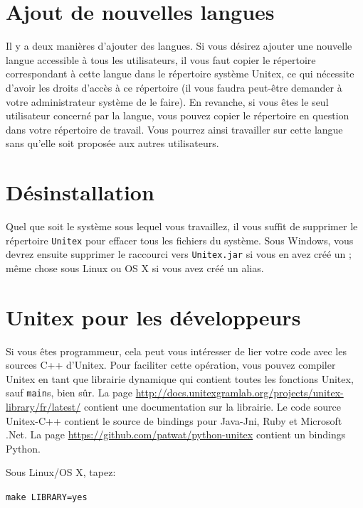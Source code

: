 \section{Ajout de nouvelles langues}

\bigskip
\noindent Il y a deux manières d’ajouter des langues. Si vous désirez ajouter une nouvelle langue
accessible à tous les utilisateurs, il vous faut copier le répertoire correspondant à cette langue
dans le répertoire système Unitex,
ce qui nécessite d’avoir les droits d’accès à ce répertoire
(il vous faudra peut-être demander à votre administrateur système de le faire).
En revanche, si vous êtes le seul utilisateur concerné par la langue, vous pouvez copier le répertoire
en question dans votre répertoire de travail.
Vous pourrez ainsi travailler sur cette langue sans qu’elle soit proposée aux autres utilisateurs.



\section{Désinstallation}
Quel que soit le système sous lequel vous travaillez, il vous suffit de supprimer le répertoire
\verb+Unitex+ pour effacer tous les fichiers du système. Sous Windows, vous devrez ensuite supprimer
le raccourci vers \verb+Unitex.jar+  si vous en avez créé un ;
même chose sous Linux ou OS X si vous avez créé un alias.


\section{Unitex pour les développeurs}
\label{section-unitex-developpers}
Si vous êtes programmeur, cela peut vous intéresser de lier votre code avec les sources C++
d'Unitex. Pour faciliter cette opération, vous pouvez compiler Unitex en tant que librairie
dynamique qui contient toutes les fonctions Unitex, sauf \verb+main+s, bien sûr. La
page \url{http://docs.unitexgramlab.org/projects/unitex-library/fr/latest/} contient une documentation sur la librairie.
Le code source Unitex-C++ contient le source de bindings pour Java-Jni, Ruby et Microsoft .Net. La
page \url{https://github.com/patwat/python-unitex} contient un bindings Python.


\bigskip
Sous Linux/OS X, tapez:

\bigskip
\verb+make LIBRARY=yes+


